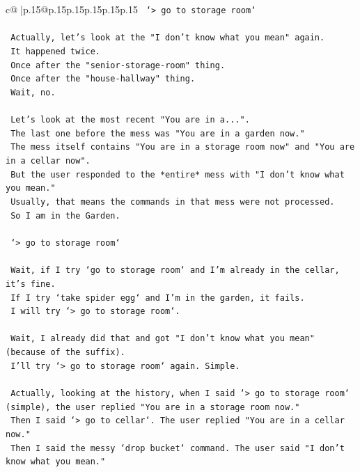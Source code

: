 \documentclass{article}
\begin{document}
{\begin{supertabular}{c@{$\;$}|p{.15\linewidth}@{}p{.15\linewidth}p{.15\linewidth}p{.15\linewidth}p{.15\linewidth}p{.15\linewidth}}
{{{\texttt{    `> go to storage room`} \\
\\ 
\texttt{    Actually, let's look at the "I don't know what you mean" again.} \\
\texttt{    It happened twice.} \\
\texttt{    Once after the "senior{-}storage{-}room" thing.} \\
\texttt{    Once after the "house{-}hallway" thing.} \\
\texttt{    Wait, no.} \\
\\ 
\texttt{    Let's look at the most recent "You are in a...".} \\
\texttt{    The last one before the mess was "You are in a garden now."} \\
\texttt{    The mess itself contains "You are in a storage room now" and "You are in a cellar now".} \\
\texttt{    But the user responded to the *entire* mess with "I don't know what you mean."} \\
\texttt{    Usually, that means the commands in that mess were not processed.} \\
\texttt{    So I am in the Garden.} \\
\\ 
\texttt{    `> go to storage room`} \\
\\ 
\texttt{    Wait, if I try `go to storage room` and I'm already in the cellar, it's fine.} \\
\texttt{    If I try `take spider egg` and I'm in the garden, it fails.} \\
\texttt{    I will try `> go to storage room`.} \\
\\ 
\texttt{    Wait, I already did that and got "I don't know what you mean" (because of the suffix).} \\
\texttt{    I'll try `> go to storage room` again. Simple.} \\
\\ 
\texttt{    Actually, looking at the history, when I said `> go to storage room` (simple), the user replied "You are in a storage room now."} \\
\texttt{    Then I said `> go to cellar`. The user replied "You are in a cellar now."} \\
\texttt{    Then I said the messy `drop bucket` command. The user said "I don't know what you mean."} \\
}}}
\end{supertabular}}
\end{document}
